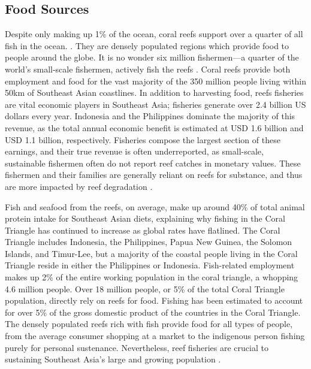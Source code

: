 \documentclass{book}\usepackage{knitr}
\begin{document}
\begin{knitrout}
\begin{kframe}
\subsection{Food Sources}

Despite only making up 1\% of the ocean, coral reefs support over a quarter of all fish in the ocean. \citep{noaa}. They are densely populated regions which provide food to people around the globe. It is no wonder six million fishermen—a quarter of the world's small-scale fishermen, actively fish the reefs \citep{coralreefalliance_2021}. Coral reefs provide both employment and food for the vast majority of the 350 million people living within 50km of Southeast Asian coastlines. In addition to harvesting food, reefs fisheries are vital economic players in Southeast Asia; fisheries generate over 2.4 billion US dollars every year. Indonesia and the Philippines dominate the majority of this revenue, as the total annual economic benefit is estimated at USD 1.6 billion and USD 1.1 billion, respectively.  Fisheries compose the largest section of these earnings, and their true revenue is often underreported, as small-scale, sustainable fishermen often do not report reef catches in monetary values. These fishermen and their families are generally reliant on reefs for substance, and thus are more impacted by reef degradation \citep{RAR}.

Fish and seafood from the reefs, on average, make up around 40\% of total animal protein intake for Southeast Asian diets, explaining why fishing in the Coral Triangle has continued to increase as global rates have flatlined. The Coral Triangle includes Indonesia, the Philippines, Papua New Guinea, the Solomon Islands, and Timur-Lee, but a majority of the coastal people living in the Coral Triangle reside in either the Philippines or Indonesia. Fish-related employment makes up 2\% of the entire working population in the coral triangle, a whopping 4.6 million people. Over 18 million people, or 5\% of the total Coral Triangle population, directly rely on reefs for food. Fishing has been estimated to account for over 5\% of the gross domestic product of the countries in the Coral Triangle. The densely populated reefs rich with fish provide food for all types of people, from the average consumer shopping at a market to the indigenous person fishing purely for personal sustenance. Nevertheless, reef fisheries are crucial to sustaining Southeast Asia’s large and growing population \citep{coraltriangle}.


\end{kframe}
\end{knitrout}
\end{document}
